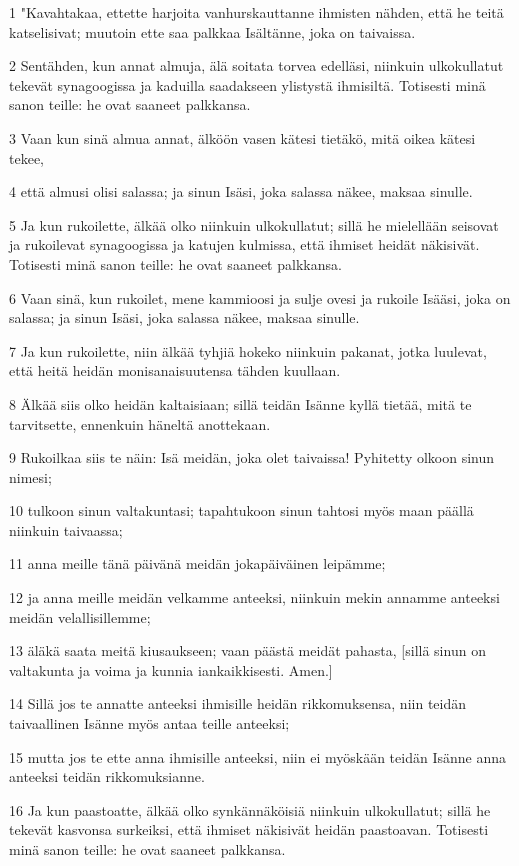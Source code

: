 \par 1 "Kavahtakaa, ettette harjoita vanhurskauttanne ihmisten nähden, että he teitä katselisivat; muutoin ette saa palkkaa Isältänne, joka on taivaissa.
\par 2 Sentähden, kun annat almuja, älä soitata torvea edelläsi, niinkuin ulkokullatut tekevät synagoogissa ja kaduilla saadakseen ylistystä ihmisiltä. Totisesti minä sanon teille: he ovat saaneet palkkansa.
\par 3 Vaan kun sinä almua annat, älköön vasen kätesi tietäkö, mitä oikea kätesi tekee,
\par 4 että almusi olisi salassa; ja sinun Isäsi, joka salassa näkee, maksaa sinulle.
\par 5 Ja kun rukoilette, älkää olko niinkuin ulkokullatut; sillä he mielellään seisovat ja rukoilevat synagoogissa ja katujen kulmissa, että ihmiset heidät näkisivät. Totisesti minä sanon teille: he ovat saaneet palkkansa.
\par 6 Vaan sinä, kun rukoilet, mene kammioosi ja sulje ovesi ja rukoile Isääsi, joka on salassa; ja sinun Isäsi, joka salassa näkee, maksaa sinulle.
\par 7 Ja kun rukoilette, niin älkää tyhjiä hokeko niinkuin pakanat, jotka luulevat, että heitä heidän monisanaisuutensa tähden kuullaan.
\par 8 Älkää siis olko heidän kaltaisiaan; sillä teidän Isänne kyllä tietää, mitä te tarvitsette, ennenkuin häneltä anottekaan.
\par 9 Rukoilkaa siis te näin: Isä meidän, joka olet taivaissa! Pyhitetty olkoon sinun nimesi;
\par 10 tulkoon sinun valtakuntasi; tapahtukoon sinun tahtosi myös maan päällä niinkuin taivaassa;
\par 11 anna meille tänä päivänä meidän jokapäiväinen leipämme;
\par 12 ja anna meille meidän velkamme anteeksi, niinkuin mekin annamme anteeksi meidän velallisillemme;
\par 13 äläkä saata meitä kiusaukseen; vaan päästä meidät pahasta, [sillä sinun on valtakunta ja voima ja kunnia iankaikkisesti. Amen.]
\par 14 Sillä jos te annatte anteeksi ihmisille heidän rikkomuksensa, niin teidän taivaallinen Isänne myös antaa teille anteeksi;
\par 15 mutta jos te ette anna ihmisille anteeksi, niin ei myöskään teidän Isänne anna anteeksi teidän rikkomuksianne.
\par 16 Ja kun paastoatte, älkää olko synkännäköisiä niinkuin ulkokullatut; sillä he tekevät kasvonsa surkeiksi, että ihmiset näkisivät heidän paastoavan. Totisesti minä sanon teille: he ovat saaneet palkkansa.
